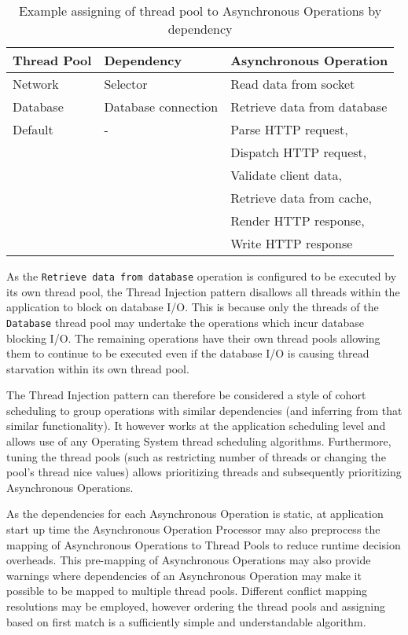 \documentclass{article}
\begin{document}
\begin{table}[!h]
\renewcommand{\arraystretch}{1.3}
\centering
\begin{tabular}{l||l||l}
\hline
\bfseries Thread Pool & \bfseries Dependency & \bfseries Asynchronous Operation \\
\hline\hline
Network & Selector & Read data from socket \\
\hline
Database & Database connection & Retrieve data from database \\
\hline
Default & - & Parse HTTP request, \\
& & Dispatch HTTP request, \\
& & Validate client data, \\ 
& & Retrieve data from cache, \\
& & Render HTTP response, \\
& & Write HTTP response \\
\hline
\end{tabular}
\caption{Example assigning of thread pool to Asynchronous Operations by dependency}
\label{tab:example_request_thread_pools}
\end{table}

As the \texttt{Retrieve data from database} operation is configured to be
executed by its own thread pool, the Thread Injection pattern disallows all
threads within the application to block on database I/O.  This is because only
the threads of the \texttt{Database} thread pool may undertake the operations
which incur database blocking I/O.  The remaining operations have their own
thread pools allowing them to continue to be executed even if the database I/O
is causing thread starvation within its own thread pool.

The Thread Injection pattern can therefore be considered a style of cohort
scheduling \cite{cohort} to group operations with similar dependencies (and
inferring from that similar functionality).  It however works at the application
scheduling level and allows use of any Operating System thread scheduling
algorithms.  Furthermore, tuning the thread pools (such as restricting number of
threads or changing the pool's thread nice values) allows prioritizing threads and
subsequently prioritizing Asynchronous Operations.

As the dependencies for each Asynchronous Operation is static, at application
start up time the Asynchronous Operation Processor may also preprocess the
mapping of Asynchronous Operations to Thread Pools to reduce runtime decision
overheads.  This pre-mapping of Asynchronous Operations may also provide
warnings where dependencies of an Asynchronous Operation may make it possible to
be mapped to multiple thread pools.  Different conflict mapping resolutions may
be employed, however ordering the thread pools and assigning based on first
match is a sufficiently simple and understandable algorithm.
\end{document}
